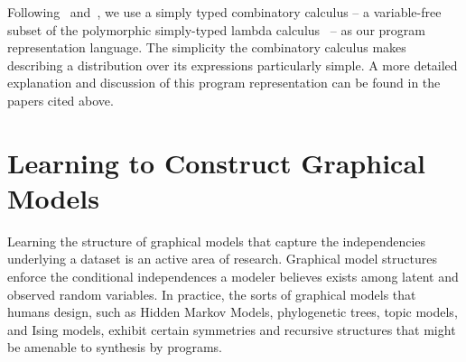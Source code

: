 \documentclass{article} %
\begin{document}
Following~\citet{DBLP:conf/ijcai/DechterMAT13} and~\citet{DBLP:conf/icml/LiangJK10}, we use a
simply typed combinatory calculus -- a variable-free subset of the
polymorphic simply-typed lambda calculus~\citep{DBLP:books/daglib/0005958} -- as our
program representation language. The simplicity the combinatory calculus makes describing a distribution over its expressions particularly simple. A more detailed explanation and discussion of this program representation can be found in the papers cited above. 

\section{Learning to Construct Graphical Models}

Learning the structure of graphical models that capture the independencies underlying a dataset is an active area of research\cite{adams-wallach-ghahramani-2010a}\cite{ISI:000240797500002}\cite{ISI:000178037200004}\cite{DBLP:journals/corr/abs-1302-6815}. Graphical model structures enforce the conditional independences a modeler believes exists among latent and observed random variables\cite{DBLP:books/daglib/0066829}.
In practice, the sorts of graphical models that humans design, such as Hidden Markov Models, phylogenetic trees, topic models, and Ising models, exhibit certain symmetries and recursive structures that might be amenable to synthesis by programs.
\end{document}
